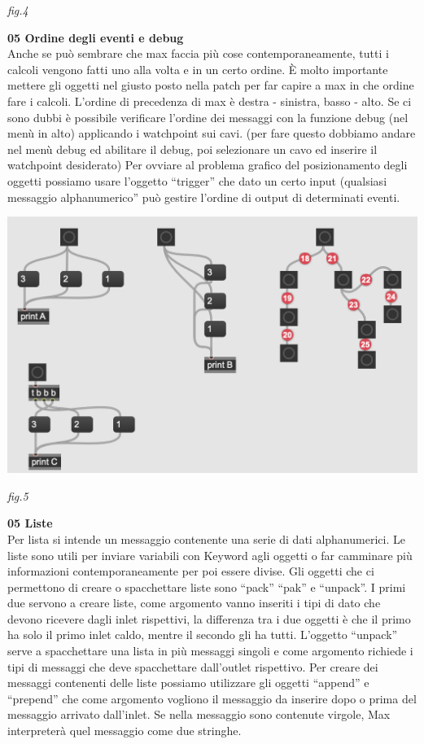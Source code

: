 \documentclass[11pt]{article}
\begin{document}
\begin{multicols*}{2}
\begin{center}
{\scriptsize \emph{fig.4 }}
\end{center}

\textbf{\textsf {05 Ordine degli eventi e debug}}\\

\noindent Anche se può sembrare che max faccia più cose contemporaneamente, tutti i calcoli vengono fatti uno alla volta e in un certo ordine. È molto importante mettere gli oggetti nel giusto posto nella patch per far capire a max in che ordine fare i calcoli.
L’ordine di precedenza di max è destra - sinistra, basso - alto. Se ci sono dubbi è possibile verificare l’ordine dei messaggi con la funzione debug (nel menù in alto) applicando i watchpoint sui cavi. (per fare questo dobbiamo andare nel menù debug ed abilitare il debug, poi selezionare un cavo ed inserire il watchpoint desiderato)
Per ovviare al problema grafico del posizionamento degli oggetti possiamo usare l’oggetto “trigger” che dato un certo input (qualsiasi messaggio alphanumerico” può gestire l’ordine di output di determinati eventi.

\begin{center}
\includegraphics[scale=0.3]{images/05_debug.png}

{\scriptsize \emph{fig.5 }}
\end{center}

\textbf{\textsf {05 Liste}}\\

\noindent Per lista si intende un messaggio contenente una serie di dati alphanumerici. Le liste sono utili per inviare variabili con Keyword agli oggetti o far camminare più informazioni contemporaneamente per poi essere divise.
Gli oggetti che ci permettono di creare o spacchettare liste sono “pack” “pak” e “unpack”. I primi due servono a creare liste, come argomento vanno inseriti i tipi di dato che devono ricevere dagli inlet rispettivi, la differenza tra i due oggetti è che il primo ha solo il primo inlet caldo, mentre il secondo gli ha tutti. L’oggetto “unpack” serve a spacchettare una lista in più messaggi singoli e come argomento richiede i tipi di messaggi che deve spacchettare dall’outlet rispettivo.
Per creare dei messaggi contenenti delle liste possiamo utilizzare gli oggetti “append” e “prepend” che come argomento vogliono il messaggio da inserire dopo o prima del messaggio arrivato dall’inlet. Se nella messaggio sono contenute virgole, Max interpreterà quel messaggio come due stringhe.


\end{multicols*}
\end{document}
